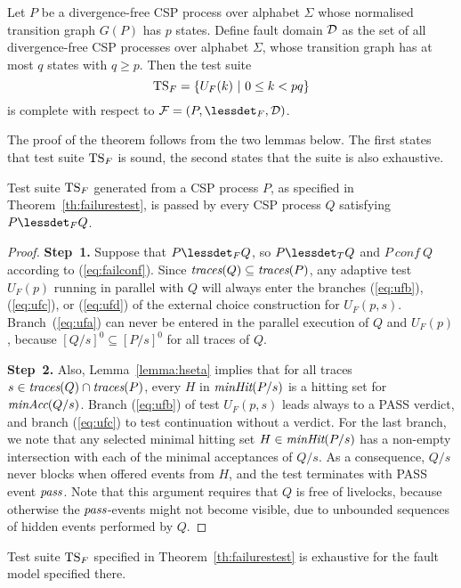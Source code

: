 \begin{theorem}\label{th:failurestest}
Let $P$ be a divergence-free CSP process over alphabet $\Sigma$ whose
normalised transition graph $G(P)$ has $p$ states. Define fault domain ${\cal
D}$ as the set of all divergence-free CSP processes over alphabet $\Sigma$,
whose transition graph has at most $q$ states with $q \ge p$. Then the test
suite
\[
{\text{TS}}_F = \{ U_F(k)~|~0 \le k < pq  \}
\]
is complete with respect to ${\cal F} = (P,\lessdet_F,{\cal D})$.
\end{theorem}
%
The proof of the theorem follows from the two lemmas below. The first states
that test suite ${\text{TS}}_F$ is sound, the second states that the suite is also
exhaustive.
%
\begin{lemma}\label{lemma:mainfsound}
Test suite ${\text{TS}}_F$ generated from a CSP process $P$, as specified in
Theorem~\ref{th:failurestest}, is passed by every CSP process $Q$ satisfying
$P\lessdet_F Q$.
\end{lemma}
\begin{proof}
{\bf Step~1.} Suppose that $P\lessdet_F Q$, so $P\lessdet_T Q$ and  $P\ conf\
Q$ according to (\ref{eq:failconf}). Since   $\text{\it traces}(Q)\subseteq \text{\it traces}(P)$,
any adaptive test $U_F(p)$ running in parallel with $Q$ will always enter the
branches (\ref{eq:ufb}), (\ref{eq:ufc}), or (\ref{eq:ufd}) of the external
choice construction for $U_F(p,s)$. Branch~(\ref{eq:ufa}) can never be
entered in the parallel execution of $Q$ and $U_F(p)$, because
$[Q/s]^0\subseteq [P/s]^0$ for all traces of $Q$.

{\bf Step~2.} Also,  Lemma~\ref{lemma:hseta} implies that for all traces
$s\in\text{\it traces}(Q)\cap\text{\it traces}(P)$, every $H$ in $\text{\it minHit}(P/s)$ is a hitting set for
$\text{\it minAcc}(Q/s)$. Branch (\ref{eq:ufb}) of test $U_F(p,s)$ leads always to a
PASS verdict, and branch (\ref{eq:ufc}) to test continuation without a
verdict. For the last branch, we note that any selected minimal hitting set
$H\in\text{\it minHit}(P/s)$ has a non-empty intersection with each of the minimal
acceptances of $Q/s$. As a consequence, $Q/s$ never blocks when offered
events from $H$, and the test terminates with PASS event ${\text{\it pass}}$. Note that
this argument requires that $Q$ is free of livelocks, because otherwise the
${\text{\it pass}}$-events might not become visible, due to unbounded sequences of
hidden events performed by $Q$. \xbox
\end{proof}
%
\begin{lemma}\label{lemma:mainfexhaustive}
Test suite ${\text{TS}}_F$ specified in Theorem~\ref{th:failurestest} is exhaustive
for the fault model specified there.
\end{lemma}
